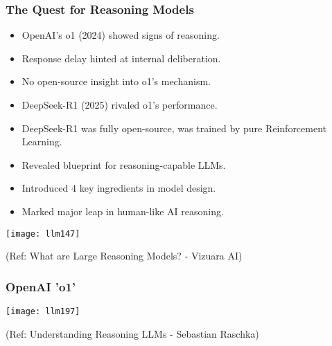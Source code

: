 \begin{frame}[fragile]\frametitle{The Quest for Reasoning Models}

		\begin{itemize}
		  \item OpenAI’s o1 (2024) showed signs of reasoning.
		  \item Response delay hinted at internal deliberation.
		  \item No open-source insight into o1’s mechanism.
		  \item DeepSeek-R1 (2025) rivaled o1’s performance.
		  \item DeepSeek-R1 was fully open-source, was trained by pure Reinforcement Learning.
		  \item Revealed blueprint for reasoning-capable LLMs.
		  \item Introduced 4 key ingredients in model design.
		  \item Marked major leap in human-like AI reasoning.
		\end{itemize}

		\begin{center}
		\texttt{[image: llm147]}
		
		{\tiny (Ref: What are Large Reasoning Models? - Vizuara AI)}
		
		\end{center}

\end{frame}

\begin{frame}[fragile]\frametitle{OpenAI 'o1'}

		\begin{center}
		\texttt{[image: llm197]}
		
		{\tiny (Ref: Understanding Reasoning LLMs - Sebastian Raschka)}
	
		\end{center}

 
\end{frame}


